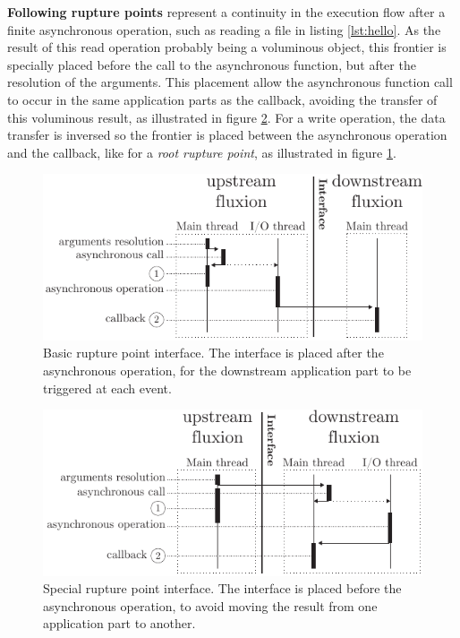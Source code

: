 \textbf{Following rupture points} represent a continuity in the execution flow after a finite asynchronous operation, such as reading a file in listing \ref{lst:hello}.
As the result of this read operation probably being a voluminous object, this frontier is specially placed before the call to the asynchronous function, but after the resolution of the arguments.
This placement allow the asynchronous function call to occur in the same application parts as the callback, avoiding the transfer of this voluminous result, as illustrated in figure \ref{fig:specialrp}.
For a write operation, the data transfer is inversed so the frontier is placed between the asynchronous operation and the callback, like for a \textit{root rupture point}, as illustrated in figure \ref{fig:basicrp}.

\begin{figure}[h!]
\begin{center}
  \includegraphics[width=\linewidth]{ressources/basicrp.pdf}
  \caption{Basic rupture point interface. \textnormal{The interface is placed after the asynchronous operation, for the downstream application part to be triggered at each event.}}
  \label{fig:basicrp}
\end{center}
\end{figure}

\begin{figure}[h!]
\begin{center}
  \includegraphics[width=\linewidth]{ressources/specialrp.pdf}
  \caption{Special rupture point interface. \textnormal{The interface is placed before the asynchronous operation, to avoid moving the result from one application part to another.}}
  \label{fig:specialrp}
\end{center}
\end{figure}

